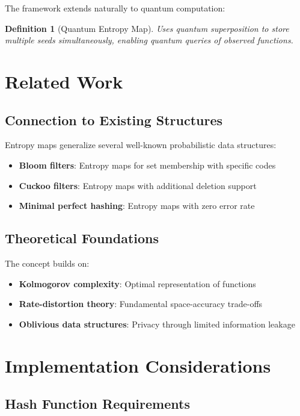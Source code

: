\documentclass[11pt,final,hidelinks]{article}
\newtheorem{definition}[theorem]{Definition}
\begin{document}
The framework extends naturally to quantum computation:

\begin{definition}[Quantum Entropy Map]
Uses quantum superposition to store multiple seeds simultaneously, enabling quantum queries of observed functions.
\end{definition}

\section{Related Work}

\subsection{Connection to Existing Structures}

Entropy maps generalize several well-known probabilistic data structures:
\begin{itemize}
    \item \textbf{Bloom filters}: Entropy maps for set membership with specific codes
    \item \textbf{Cuckoo filters}: Entropy maps with additional deletion support
    \item \textbf{Minimal perfect hashing}: Entropy maps with zero error rate
\end{itemize}

\subsection{Theoretical Foundations}

The concept builds on:
\begin{itemize}
    \item \textbf{Kolmogorov complexity}: Optimal representation of functions
    \item \textbf{Rate-distortion theory}: Fundamental space-accuracy trade-offs
    \item \textbf{Oblivious data structures}: Privacy through limited information leakage
\end{itemize}

\section{Implementation Considerations}

\subsection{Hash Function Requirements}
\end{document}
